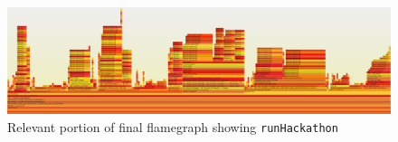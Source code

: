 \documentclass[12pt,reqno]{article}
\begin{document}
\begin{figure}[H]
    \centering
    \includegraphics[width=1\textwidth]{images/final_fg.png}
    \caption{Relevant portion of final flamegraph showing \texttt{runHackathon}}
    \label{fig:final-fg}
\end{figure}


\clearpage
\pagebreak
\end{document}
